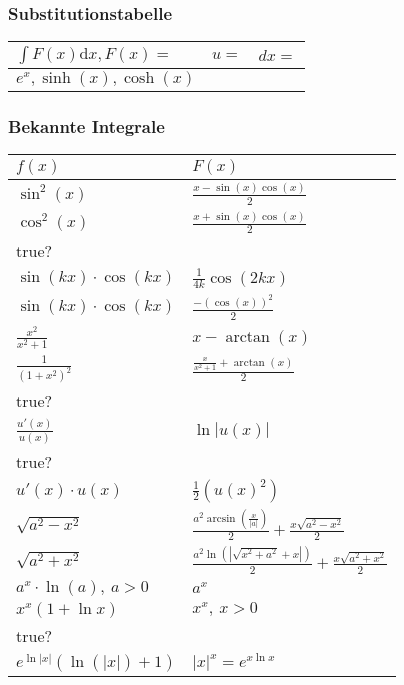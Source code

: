 \subsubsection{Substitutionstabelle}
\begin{tabular}{l | c | c}
    $\int F(x) \mathrm{d}x, F(x)=$ & $u=$ & $dx=$\\\hline
    $e^x, \sinh(x), \cosh(x)$ &  
\end{tabular}

\subsubsection{Bekannte Integrale}
\begin{tabular}{l | l}
    $f(x)$                      & $F(x)$\\\hline
    $\sin^2(x)$                 & $\frac{x - \sin(x) \cos(x)}{2}$\\
    $\cos^2(x)$                 & $\frac{x + \sin(x) \cos(x)}{2}$\\
    true?&\\
    $\sin(kx) \cdot \cos(kx)$   & $\frac{1}{4k}\cos(2kx)$\\
    $\sin(kx) \cdot \cos(kx)$   & $\frac{-(\cos(x))^2}{2}$\\
    $\frac{x^2}{x^2 + 1}$       & $x - \arctan(x)$\\
    $\frac{1}{(1 + x^2)^2}$     & $\frac{\frac{x}{x^2 + 1} + \arctan(x)}{2}$\\
    true?&\\
    $\frac{u'(x)}{u(x)}$        & $\ln |u(x)|$\\
    true?&\\
    $u'(x) \cdot u(x)$          & $\frac{1}{2}(u(x)^2)$\\
    $\sqrt{a^2 - x^2}$          & $\frac{a^2 \arcsin(\frac{x}{|a|})}{2} + \frac{x \sqrt{a^2 - x^2}}{2}$\\
    $\sqrt{a^2 + x^2}$          & $\frac{a^2 \ln(| \sqrt{x^2 + a^2} +x|)}{2} + \frac{x \sqrt{a^2 + x^2}}{2}$\\
    $a^x \cdot \ln(a), \ a > 0$ & $a^x$\\
    $x^x (1 + \ln x)$           & $x^x, \ x > 0$\\
    true?&\\
    $e^{\ln |x|}(\ln(|x|) + 1)$ & $|x|^x = e^{x \ln x}$\\
\end{tabular}

